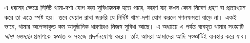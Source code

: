 \documentclass[../../../include/open-logic-section]{subfiles}
\begin{document}
\begin{explain}
এ ধরনের ক্ষেত্রে নির্দিষ্ট থামা-দশা যোগ করা সুবিধাজনক হতে পারে, কারণ
যন্ত্র কখন কোন নিবেশ গ্রহণ বা প্রত্যাখ্যান করে তা এতে স্পষ্ট হয়। তবে
খেয়াল রাখা জরুরি যে নির্দিষ্ট থামা-দশা যোগ করলে গণনক্ষমতা বাড়ে না। একই
ভাবে, থামার অপেক্ষাকৃত কম আনুষ্ঠানিক ধারণারও নিজস্ব সুবিধা আছে। এ অধ্যায়ে
এ পর্যন্ত ব্যবহৃত থামার সংজ্ঞাটি \emph{থামা সমস্যার} প্রমাণকে স্বজ্ঞাত ও
সহজে প্রদর্শনযোগ্য করে। তাই আমরা আমাদের আদি সংজ্ঞাটিই ব্যবহার করে যাব।
\end{explain}
\end{document}
